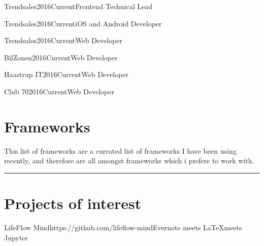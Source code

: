 \documentclass[10pt, a4paper]{article}
\begin{document}
	\begin{cvexp}{Trendsales}{2016}{Current}{Frontend Technical Lead}
		\kant[1]
	\end{cvexp}

	\begin{cvexp}{Trendsales}{2016}{Current}{iOS and Android Developer}
		\kant[1]
	\end{cvexp}

	\begin{cvexp}{Trendsales}{2016}{Current}{Web Developer}
		\kant[1]
	\end{cvexp}

	\begin{cvexp}{BilZonen}{2016}{Current}{Web Developer}
	\kant[1]
	\end{cvexp}

	\begin{cvexp}{Haastrup IT}{2016}{Current}{Web Developer}
	\kant[1]
	\end{cvexp}

	\begin{cvexp}{Club 70}{2016}{Current}{Web Developer}
	\kant[1]
	\end{cvexp}

	\section*{Frameworks}

	This list of frameworks are a currated list of frameworks I have been using recently, and therefore are all amongst frameworks which i prefere to work with.\\

	\noindent\begin{minipage}{\textwidth}
		\begin{multicols}{\skillcolumncount}
		\end{multicols}
		\vspace{0.5cm}
		\hrule
	\end{minipage}

	\section*{Projects of interest}
	\begin{cvproj}{LifeFlow Mind}{https://github.com/lifeflow-mind}{Evernote meets \LaTeX meets Jupyter}
		\kant[1]
	\end{cvproj}

	
\end{document}
